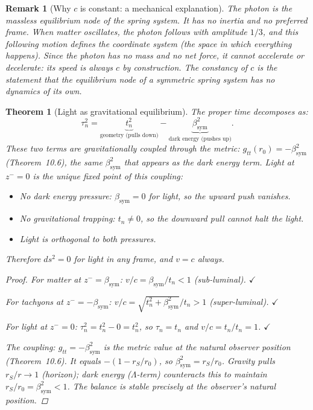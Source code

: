 \documentclass[12pt,a4paper]{article}
\newtheorem{theorem}{Theorem}[section]
\newtheorem*{remark}{Remark}
\newcommand{\bsym}{\beta_{\mathrm{sym}}}
\newcommand{\zminus}{z^-}
\begin{document}
\begin{remark}[Why $c$ is constant: a mechanical explanation]
The photon is the massless equilibrium node of the spring system.
It has no inertia and no preferred frame.
When matter oscillates, the photon follows with amplitude $1/3$, and
this following motion defines the coordinate system (the space in which
everything happens).
Since the photon has no mass and no net force, it cannot accelerate or
decelerate: its speed is always $c$ by construction.
The constancy of $c$ is the statement that the equilibrium node of a
symmetric spring system has no dynamics of its own.
\end{remark}

\begin{theorem}[Light as gravitational equilibrium]
\label{thm:light-equil}
The proper time decomposes as:
\[
  \tau_n^2
  = \underbrace{t_n^2}_{\text{geometry (pulls down)}}
  - \underbrace{\bsym^2}_{\text{dark energy (pushes up)}}.
\]
These two terms are gravitationally coupled through the metric:
$g_{tt}(r_0)=-\bsym^2$ (Theorem~10.6), the same $\bsym^2$
that appears as the dark energy term.
Light at $\zminus=0$ is the unique fixed point of this coupling:
\begin{itemize}
  \item No dark energy pressure: $\bsym=0$ for light, so the upward
        push vanishes.
  \item No gravitational trapping: $t_n\neq 0$, so the downward pull
        cannot halt the light.
  \item Light is orthogonal to both pressures.
\end{itemize}
Therefore $ds^2=0$ for light in any frame, and $v=c$ always.
\begin{proof}
For matter at $\zminus=\bsym$: $v/c=\bsym/t_n<1$ (sub-luminal). $\checkmark$

For tachyons at $\zminus=-\bsym$:
$v/c=\sqrt{t_n^2+\bsym^2}/t_n>1$ (super-luminal). $\checkmark$

For light at $\zminus=0$:
$\tau_n^2=t_n^2-0=t_n^2$, so $\tau_n=t_n$ and $v/c=t_n/t_n=1$.
$\checkmark$

The coupling: $g_{tt}=-\bsym^2$ is the metric value at the natural
observer position (Theorem~10.6).
It equals $-(1-r_S/r_0)$, so $\bsym^2=r_S/r_0$.
Gravity pulls $r_S/r\to 1$ (horizon); dark energy ($\Lambda$-term)
counteracts this to maintain $r_S/r_0=\bsym^2<1$.
The balance is stable precisely at the observer's natural position.
\end{proof}
\end{theorem}
\end{document}
